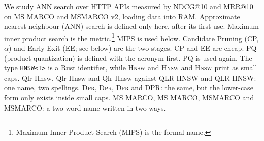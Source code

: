 \documentclass{article}
\begin{document}
We study ANN search over HTTP APIs measured by NDCG@10 and MRR@10 on MS MARCO and MSMARCO v2, loading data into RAM.
Approximate nearest neighbour (ANN) search is defined only here, after its first use.
Maximum inner product search is the metric.\footnote{Maximum Inner Product Search (MIPS) is the formal name.} MIPS is used below.
Candidate Pruning (CP, $\alpha$) and Early Exit (EE; see below) are the two stages. CP and EE are cheap.
PQ (product quantization) is defined with the acronym first. PQ is used again.
The type \texttt{HNSW<T>} is a Rust identifier, while \textsc{Hnsw} and \textsc{Hnsw} and \textsc{Hnsw} print as small caps.
Qlr-Hnsw, Qlr-Hnsw and Qlr-Hnsw against QLR-HNSW and QLR-HNSW: one name, two spellings.
\textsc{Dpr}, \textsc{Dpr}, \textsc{Dpr} and DPR: the same, but the lower-case form only exists inside small caps.
MS MARCO, MS MARCO, MSMARCO and MSMARCO: a two-word name written in two ways.
\end{document}
